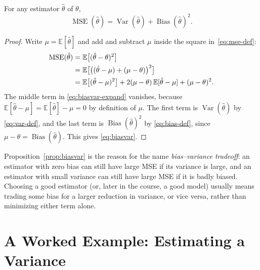 \begin{proposition}
\label{prop:biasvar}
For any estimator $\hat\theta$ of $\theta$,
\begin{equation}
\label{eq:biasvar}
\operatorname{MSE}(\hat\theta) = \operatorname{Var}(\hat\theta) + \operatorname{Bias}(\hat\theta)^2.
\end{equation}
\end{proposition}

\begin{proof}
Write $\mu = \mathbb{E}[\hat\theta]$ and add and subtract $\mu$ inside the
square in~\eqref{eq:mse-def}:
\begin{align}
\operatorname{MSE}(\hat\theta)
  &= \mathbb{E}\big[(\hat\theta - \theta)^2\big] \notag\\
  &= \mathbb{E}\big[\big((\hat\theta - \mu) + (\mu - \theta)\big)^2\big] \notag\\
  &= \mathbb{E}\big[(\hat\theta - \mu)^2\big]
     + 2(\mu - \theta)\,\mathbb{E}[\hat\theta - \mu]
     + (\mu - \theta)^2. \label{eq:biasvar-expand}
\end{align}
The middle term in \eqref{eq:biasvar-expand} vanishes, because
$\mathbb{E}[\hat\theta - \mu] = \mathbb{E}[\hat\theta] - \mu = 0$ by
definition of $\mu$. The first term is $\operatorname{Var}(\hat\theta)$
by \eqref{eq:var-def}, and the last term is $\operatorname{Bias}(\hat\theta)^2$
by \eqref{eq:bias-def}, since $\mu - \theta = \operatorname{Bias}(\hat\theta)$.
This gives \eqref{eq:biasvar}.
\end{proof}

\begin{remark}
\label{rem:tradeoff}
Proposition~\ref{prop:biasvar} is the reason for the name
\emph{bias--variance tradeoff}: an estimator with zero bias can still
have large MSE if its variance is large, and an estimator with small
variance can still have large MSE if it is badly biased. Choosing a good
estimator (or, later in the course, a good model) usually means trading
some bias for a larger reduction in variance, or vice versa, rather than
minimizing either term alone.
\end{remark}

\section{A Worked Example: Estimating a Variance}

